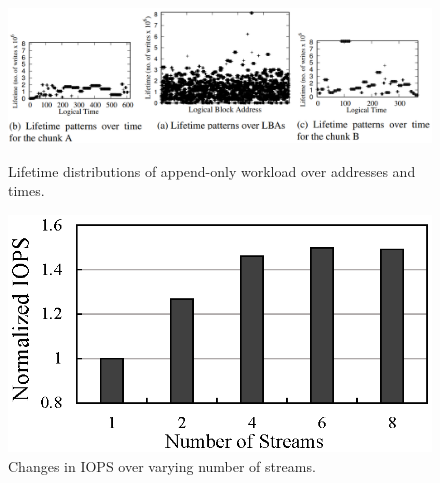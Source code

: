 \begin{figure}[t]
	\includegraphics[width=\linewidth]{figure/fig1_new.png}
	\caption{Lifetime distributions of append-only workload over addresses and times.}
	\label{fig:lba_lifetime}
	\endminipage \hfill
	\includegraphics[width=\linewidth]{figure/stream_perf}
	\caption{Changes in IOPS over varying number of streams.}
	\label{fig:stream_perf}
	\endminipage 
\end{figure}


